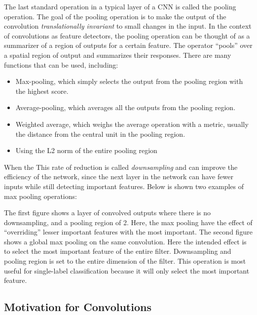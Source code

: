 The last standard operation in a typical layer of a CNN is called the pooling operation. The goal of the pooling operation is to make the output of the convolution \emph{translationally invariant} to small changes in the input. In the context of convolutions as feature detectors, the pooling operation can be thought of as a summarizer of a region of outputs for a certain feature. The operator ``pools'' over a spatial region of output and summarizes their responses. There are many functions that can be used, including:

\begin{itemize}

\item Max-pooling, which simply selects the output from the pooling region with the highest score.
\item Average-pooling, which averages all the outputs from the pooling region.
\item Weighted average, which weighs the average operation with a metric, usually the distance from the central unit in the pooling region.
\item Using the L2 norm of the entire pooling region

\end{itemize} 

When the 
This rate of reduction is called \emph{downsampling} and can improve the efficiency of the network, since the next layer in the network can have fewer inputs while still detecting important features. Below is shown two examples of 
max pooling operations:





The first figure shows a layer of convolved outputs where there is no downsampling, and a pooling region of 2. Here, the max pooling have the effect of ``overriding'' lesser important features with the most important. The second figure shows a global max pooling on the same convolution. Here the intended effect is to select the most important feature of the entire filter. Downsampling and pooling region is set to the entire dimension of the filter. This operation is most useful for single-label classification because it will only select the most important feature. 




\subsection{Motivation for Convolutions}


